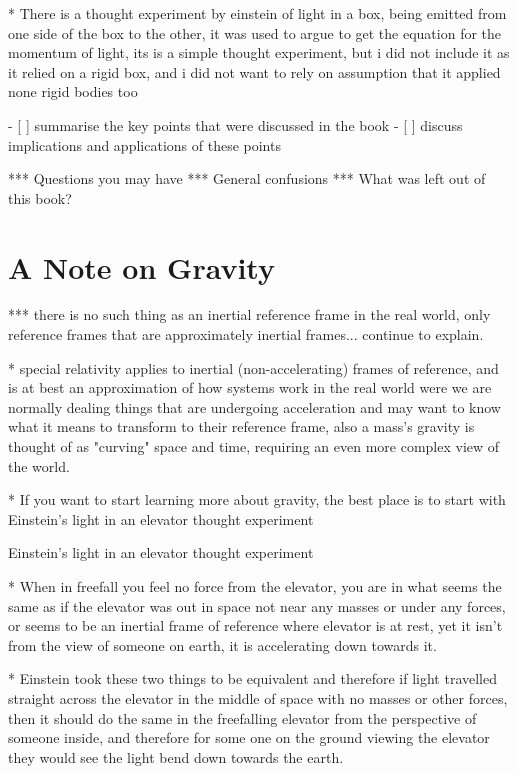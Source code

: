 * There is a thought experiment by einstein of light in a box, being emitted from one side of the box to the other, it was used to argue to get the equation for the momentum of light, its is a simple thought experiment, but i did not include it as it relied on a rigid box, and i did not want to rely on assumption that it applied none rigid bodies too

- [ ] summarise the key points that were discussed in the book
- [ ] discuss implications and applications of these points

*** Questions you may have
*** General confusions
*** What was left out of this book?

\section{A Note on Gravity}\label{sect: A Note on Gravity}

*** there is no such thing as an inertial reference frame in the real world, only reference frames that are approximately inertial frames... continue to explain.

* special relativity applies to inertial (non-accelerating) frames of reference, and is at best an approximation of how systems work in the real world were we are normally dealing things that are undergoing acceleration and may want to know what it means to transform to their reference frame, also a mass's gravity is thought of as "curving" space and time, requiring an even more complex view of the world.

* If you want to start learning more about gravity, the best place is to start with Einstein's light in an elevator thought experiment

Einstein's light in an elevator thought experiment

* When in freefall you feel no force from the elevator, you are in what seems the same as if the elevator was out in space not near any masses or under any forces, or seems to be an inertial frame of reference where elevator is at rest, yet it isn't from the view of someone on earth, it is accelerating down towards it.

* Einstein took these two things to be equivalent and therefore if light travelled straight across the elevator in the middle of space with no masses or other forces, then it should do the same in the freefalling elevator from the perspective of someone inside, and therefore for some one on the ground viewing the elevator they would see the light bend down towards the earth.

